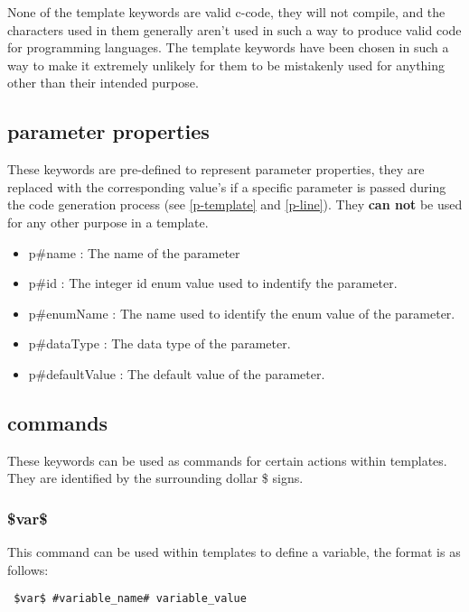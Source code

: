 \documentclass{settings/TU_Delft_Report}
\begin{document}
None of the template keywords are valid c-code, they will not compile, and the characters used in them generally aren't used in such a way to produce valid code for programming languages. The template keywords have been chosen in such a way to make it extremely unlikely for them to be mistakenly used for anything other than their intended purpose.

\subsection{parameter properties} \label{par-keywords}
These keywords are pre-defined to represent parameter properties, they are replaced with the corresponding value's if a specific parameter is passed during the code generation process (see \ref{p-template} and \ref{p-line}). They \textbf{can not} be used for any other purpose in a template.
\begin{itemize}
    \item p\#name : The name of the parameter
    \item p\#id : The integer id enum value used to indentify the parameter.
    \item p\#enumName : The name used to identify the enum value of the parameter.
    \item p\#dataType : The data type of the parameter.
    \item p\#defaultValue : The default value of the parameter.
\end{itemize}

\subsection{commands}
These keywords can be used as commands for certain actions within templates. They are identified by the surrounding dollar \$ signs.

\subsubsection{\$var\$}
This command can be used within templates to define a variable, the format is as follows:
\begin{lstlisting}
 $var$ #variable_name# variable_value
\end{lstlisting}
\end{document}
